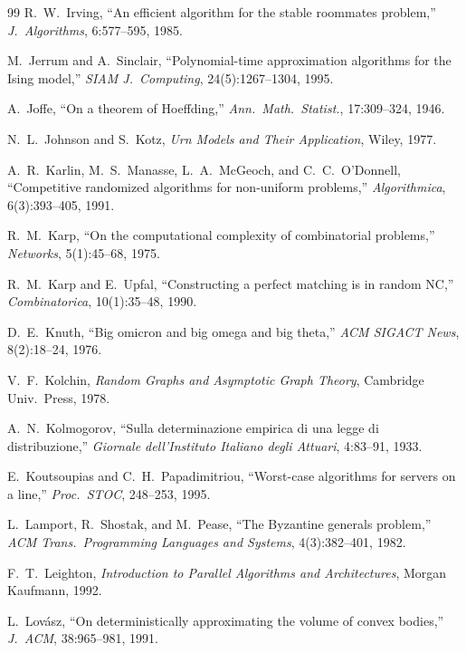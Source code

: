 \documentclass[twoside,12pt]{book}
\theoremstyle{plain}
\theoremstyle{definition}
\theoremstyle{remark}
\begin{document}
\begin{thebibliography}{99}
R.~W.~Irving,
``An efficient algorithm for the stable roommates problem,''
\textit{J.~Algorithms}, 6:577--595, 1985.

M.~Jerrum and A.~Sinclair,
``Polynomial-time approximation algorithms for the Ising model,''
\textit{SIAM J.~Computing}, 24(5):1267--1304, 1995.

A.~Joffe,
``On a theorem of Hoeffding,''
\textit{Ann.~Math.~Statist.}, 17:309--324, 1946.

N.~L.~Johnson and S.~Kotz,
\textit{Urn Models and Their Application},
Wiley, 1977.

A.~R.~Karlin, M.~S.~Manasse, L.~A.~McGeoch, and C.~C.~O'Donnell,
``Competitive randomized algorithms for non-uniform problems,''
\textit{Algorithmica}, 6(3):393--405, 1991.

R.~M.~Karp,
``On the computational complexity of combinatorial problems,''
\textit{Networks}, 5(1):45--68, 1975.

R.~M.~Karp and E.~Upfal,
``Constructing a perfect matching is in random NC,''
\textit{Combinatorica}, 10(1):35--48, 1990.

D.~E.~Knuth,
``Big omicron and big omega and big theta,''
\textit{ACM SIGACT News}, 8(2):18--24, 1976.

V.~F.~Kolchin,
\textit{Random Graphs and Asymptotic Graph Theory},
Cambridge Univ.~Press, 1978.

A.~N.~Kolmogorov,
``Sulla determinazione empirica di una legge di distribuzione,''
\textit{Giornale dell'Instituto Italiano degli Attuari}, 4:83--91, 1933.

E.~Koutsoupias and C.~H.~Papadimitriou,
``Worst-case algorithms for servers on a line,''
\textit{Proc.~STOC}, 248--253, 1995.

L.~Lamport, R.~Shostak, and M.~Pease,
``The Byzantine generals problem,''
\textit{ACM Trans.~Programming Languages and Systems}, 4(3):382--401, 1982.

F.~T.~Leighton,
\textit{Introduction to Parallel Algorithms and Architectures},
Morgan Kaufmann, 1992.

L.~Lov\'{a}sz,
``On deterministically approximating the volume of convex bodies,''
\textit{J.~ACM}, 38:965--981, 1991.


\end{thebibliography}
\end{document}
